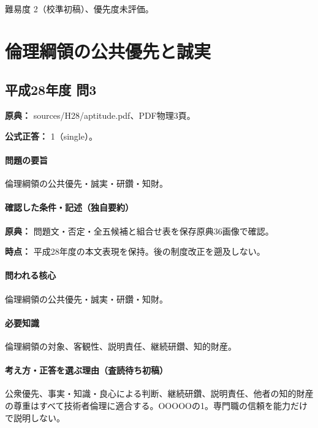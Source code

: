 \par 難易度 2（校準初稿）、優先度未評価。

\section{倫理綱領の公共優先と誠実}

\subsection{平成28年度 問3}
\label{q:h28-reg-apt-03}

\noindent\textbf{原典：} sources/H28/aptitude.pdf、PDF物理3頁。

\textbf{公式正答：} 1（single）。

\paragraph{問題の要旨} 倫理綱領の公共優先・誠実・研鑽・知財。

\paragraph{確認した条件・記述（独自要約）}\mbox{}\par

\noindent\textbf{原典：} 問題文・否定・全五候補と組合せ表を保存原典36画像で確認。\par

\noindent\textbf{時点：} 平成28年度の本文表現を保持。後の制度改正を遡及しない。\par

\paragraph{問われる核心} 倫理綱領の公共優先・誠実・研鑽・知財。

\paragraph{必要知識} 倫理綱領の対象、客観性、説明責任、継続研鑽、知的財産。

\paragraph{考え方・正答を選ぶ理由（査読待ち初稿）} 公衆優先、事実・知識・良心による判断、継続研鑽、説明責任、他者の知的財産の尊重はすべて技術者倫理に適合する。OOOOOの1。専門職の信頼を能力だけで説明しない。

